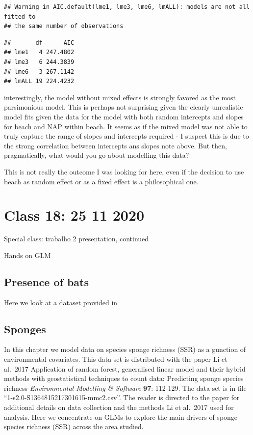 \documentclass[
]{book}
\begin{document}
\begin{verbatim}
## Warning in AIC.default(lme1, lme3, lme6, lmALL): models are not all fitted to
## the same number of observations
\end{verbatim}

\begin{verbatim}
##       df      AIC
## lme1   4 247.4802
## lme3   6 244.3839
## lme6   3 267.1142
## lmALL 19 224.4232
\end{verbatim}

interestingly, the model without mixed effects is strongly favored as the most parsimonious model. This is perhaps not surprising given the clearly unrealistic model fits given the data for the model with both random intercepts and slopes for beach and NAP within beach. It seems as if the mixed model was not able to truly capture the range of slopes and intercepts required - I suspect this is due to the strong correlation between intercepts ans slopes note above. But then, pragmatically, what would you go about modelling this data?

This is not really the outcome I was looking for here, even if the decision to use beach as random effect or as a fixed effect is a philosophical one.

\hypertarget{aula18}{%
\chapter{Class 18: 25 11 2020}\label{aula18}}

Special class: trabalho 2 presentation, continued

Hands on GLM

\hypertarget{presence-of-bats}{%
\section{Presence of bats}\label{presence-of-bats}}

Here we look at a dataset provided in

\hypertarget{sponges}{%
\section{Sponges}\label{sponges}}

In this chapter we model data on species sponge richness (SSR) as a gunction of environmental covariates. This data set is distributed with the paper Li et al.~2017 Application of random forest, generalised linear model and their hybrid methods with geostatistical techniques to count data: Predicting sponge species richness \emph{Environmental Modelling \& Software} \textbf{97}: 112-129. The data set is in file ``1-s2.0-S1364815217301615-mmc2.csv''. The reader is directed to the paper for additional details on data collection and the methods Li et al.~2017 used for analysis. Here we concentrate on GLMs to explore the main drivers of sponge species richness (SSR) across the area studied.
\end{document}
